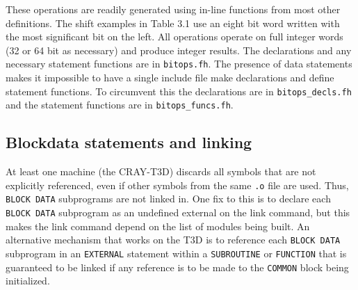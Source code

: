 These operations are readily generated using
in-line functions from most other definitions.
The shift examples in Table 3.1
use an eight bit word written with the most significant bit on the
left.
All operations operate on full integer words (32 or 64 bit as
necessary) and produce integer results.  The declarations and any
necessary statement functions are in \verb+bitops.fh+.  The presence
of data statements makes it impossible to have a single include file
make declarations and define statement functions.  To circumvent this
the declarations are in \verb+bitops_decls.fh+ and the statement
functions are in \verb+bitops_funcs.fh+.

\subsection{Blockdata statements and linking}

At least one machine (the CRAY-T3D) discards all symbols that are not
explicitly referenced, even if other symbols from the same \verb+.o+
file are used.  Thus, \verb+BLOCK DATA+ subprograms are not linked in.
One fix to this is to declare each \verb+BLOCK DATA+ subprogram as an
undefined external on the link command, but this makes the link
command depend on the list of modules being built.  An alternative
mechanism that works on the T3D is to reference each \verb+BLOCK DATA+
subprogram in an \verb+EXTERNAL+ statement within a \verb+SUBROUTINE+ or
\verb+FUNCTION+ that is guaranteed to be linked if any reference is to
be made to the \verb+COMMON+ block being initialized.


